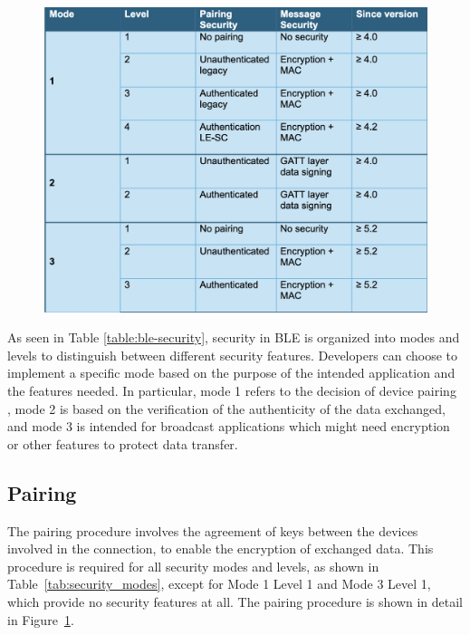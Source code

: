 \documentclass{Configuration_Files/PoliMi3i_thesis}
\begin{document}
\begin{figure}[H]
    \centering
    \includegraphics[scale=0.7]{Bluetooth_Security/1.png}
    \label{fig:pairing_procedure}
\end{figure}

As seen in Table \ref{table:ble-security}, security in BLE is organized into modes and levels to distinguish between different security features. Developers can choose to implement a specific mode based on the purpose of the intended application and the features needed. In particular, mode 1 refers to the decision of device pairing \cite{circuits2021}, mode 2 is based on the verification of the authenticity of the data exchanged, and mode 3 is intended for broadcast applications which might need encryption or other features to protect data transfer.

\subsection{Pairing}

The pairing procedure involves the agreement of keys between the devices involved in the connection, to enable the encryption of exchanged data. This procedure is required for all security modes and levels, as shown in Table~\ref{tab:security_modes}, except for Mode 1 Level 1 and Mode 3 Level 1, which provide no security features at all. The pairing procedure is shown in detail in Figure~\ref{fig:pairing_procedure}.
\end{document}
